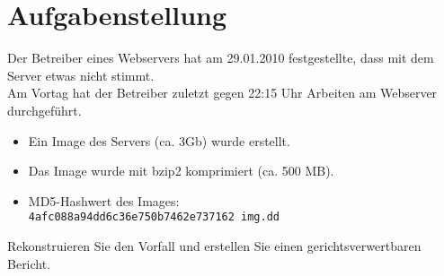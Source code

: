 \section{Aufgabenstellung}%

Der Betreiber eines Webservers hat am 29.01.2010 festgestellte, dass mit dem Server etwas nicht stimmt. \\
Am Vortag hat der Betreiber zuletzt gegen 22:15 Uhr Arbeiten am Webserver durchgeführt.
\begin{itemize}
\item Ein Image des Servers (ca. 3Gb) wurde erstellt.
\item Das Image wurde mit bzip2 komprimiert (ca. 500 MB).
\item MD5-Hashwert des Images:\\
\texttt{4afc088a94dd6c36e750b7462e737162  img.dd}
\end{itemize}

\noindent Rekonstruieren Sie den Vorfall und erstellen Sie einen gerichtsverwertbaren Bericht.